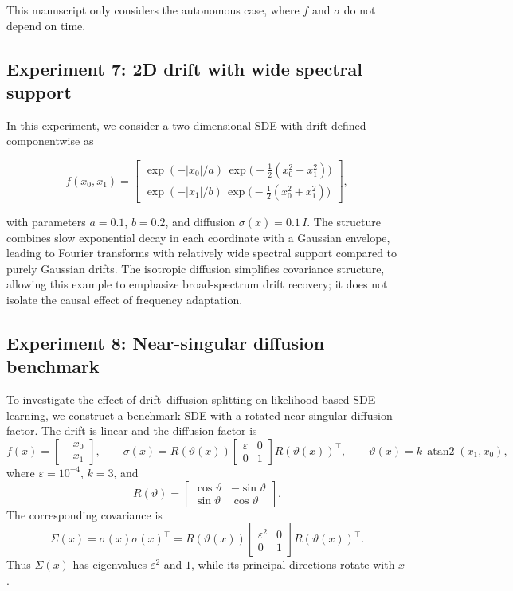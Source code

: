 \documentclass{article}
\begin{document}
This manuscript only considers the autonomous case, where $f$ and $\sigma$ do not depend on time.

\subsection{Experiment 7: 2D drift with wide spectral support}

In this experiment, we consider a two-dimensional SDE with drift defined componentwise as

\begin{equation*}
f(x_0,x_1) =
\begin{bmatrix}
\exp(-|x_0|/a)\,\exp\!\bigl(-\tfrac{1}{2}(x_0^2+x_1^2)\bigr)\\[4pt]
\exp(-|x_1|/b)\,\exp\!\bigl(-\tfrac{1}{2}(x_0^2+x_1^2)\bigr)
\end{bmatrix},
\end{equation*}

with parameters $a=0.1$, $b=0.2$, and diffusion $\sigma(x)=0.1\,I$.
The structure combines slow exponential decay in each coordinate with a Gaussian envelope, leading to Fourier transforms with relatively wide spectral support compared to purely Gaussian drifts. The isotropic diffusion simplifies covariance structure, allowing this example to emphasize broad-spectrum drift recovery; it does not isolate the causal effect of frequency adaptation.

\subsection{Experiment 8: Near-singular diffusion benchmark}
\label{sec:near_singular}

To investigate the effect of drift--diffusion splitting on likelihood-based
SDE learning, we construct a benchmark SDE with a rotated near-singular
diffusion factor. The drift is linear and the diffusion factor is
\begin{equation}
\label{eq:near_singular_setup}
f(x)=
\begin{bmatrix}
-x_0\\
-x_1
\end{bmatrix},
\qquad
\sigma(x)
=
R(\vartheta(x))
\begin{bmatrix}
\varepsilon & 0\\
0 & 1
\end{bmatrix}
R(\vartheta(x))^\top,
\qquad
\vartheta(x)=k\,\operatorname{atan2}(x_1,x_0),
\end{equation}
where $\varepsilon=10^{-4}$, $k=3$, and
\[
R(\vartheta)
=
\begin{bmatrix}
\cos\vartheta & -\sin\vartheta\\
\sin\vartheta & \cos\vartheta
\end{bmatrix}.
\]
The corresponding covariance is
\[
\Sigma(x)
=
\sigma(x)\sigma(x)^\top
=
R(\vartheta(x))
\begin{bmatrix}
\varepsilon^2 & 0\\
0 & 1
\end{bmatrix}
R(\vartheta(x))^\top.
\]
Thus $\Sigma(x)$ has eigenvalues $\varepsilon^2$ and $1$, while its principal
directions rotate with $x$.
\end{document}
